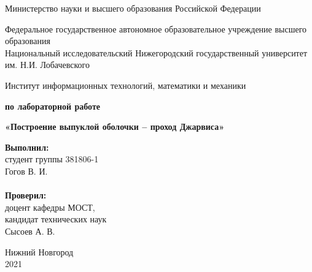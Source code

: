 \documentclass{report}
\begin{document}
\begin{titlepage}

\begin{center}
Министерство науки и высшего образования Российской Федерации
\end{center}

\begin{center}
Федеральное государственное автономное образовательное учреждение высшего образования \\
Национальный исследовательский Нижегородский государственный университет им. Н.И. Лобачевского
\end{center}

\begin{center}
Институт информационных технологий, математики и механики
\end{center}

\vspace{4em}

\begin{center}
\textbf{ по лабораторной работе} \\
\end{center}
\begin{center}
\textbf{\Large«Построение выпуклой оболочки – проход Джарвиса»} \\
\end{center}

\vspace{4em}

\newbox{\lbox}
\newlength{\maxl}
\setlength{\maxl}{\wd\lbox}
\hfill\parbox{7cm}{
\hspace*{5cm}\hspace*{-5cm}\textbf{Выполнил:} \\ студент группы 381806-1 \\ Гогов В. И.\\
\\
\hspace*{5cm}\hspace*{-5cm}\textbf{Проверил:}\\ доцент кафедры МОСТ, \\ кандидат технических наук \\ Сысоев А. В.\\
}
\vspace{\fill}

\begin{center} Нижний Новгород \\ 2021 \end{center}

\end{titlepage}
\end{document}
